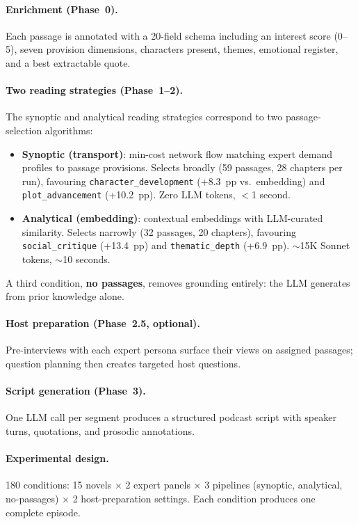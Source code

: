 \documentclass[final]{clv2025}
\begin{document}
\paragraph{Enrichment (Phase~0).}  Each passage is annotated with a
20-field schema including an interest score (0--5), seven provision
dimensions, characters present, themes, emotional register, and a best
extractable quote.

\paragraph{Two reading strategies (Phase~1--2).}

The synoptic and analytical reading strategies correspond to two
passage-selection algorithms:

\begin{itemize}
\item \textbf{Synoptic (transport)}: min-cost network flow matching
expert demand profiles to passage provisions.  Selects broadly (59
passages, 28 chapters per run), favouring \texttt{character\_development}
(+8.3~pp vs.\ embedding) and \texttt{plot\_advancement} (+10.2~pp).
Zero LLM tokens, $<$1 second.

\item \textbf{Analytical (embedding)}: contextual embeddings with
LLM-curated similarity.  Selects narrowly (32 passages, 20 chapters),
favouring \texttt{social\_critique} (+13.4~pp) and
\texttt{thematic\_depth} (+6.9~pp).  $\sim$15K Sonnet tokens, $\sim$10
seconds.
\end{itemize}

A third condition, \textbf{no passages}, removes grounding entirely:
the LLM generates from prior knowledge alone.

\paragraph{Host preparation (Phase~2.5, optional).}  Pre-interviews
with each expert persona surface their views on assigned passages;
question planning then creates targeted host questions.

\paragraph{Script generation (Phase~3).}  One LLM call per segment
produces a structured podcast script with speaker turns, quotations,
and prosodic annotations.

\paragraph{Experimental design.}  180 conditions: 15 novels $\times$
2 expert panels $\times$ 3 pipelines (synoptic, analytical,
no-passages) $\times$ 2 host-preparation settings.  Each condition
produces one complete episode.
\end{document}
